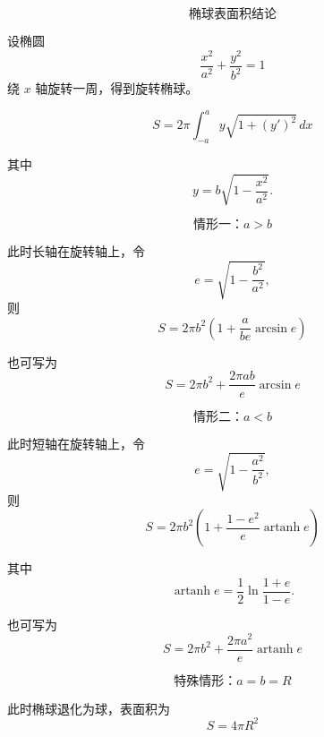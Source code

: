 \[
	\textbf{椭球表面积结论}
\]

设椭圆
\[
	\frac{x^2}{a^2}+\frac{y^2}{b^2}=1
\]
绕 \(x\) 轴旋转一周，得到旋转椭球。

\[
	\boxed{
		S=2\pi\int_{-a}^{a}y\sqrt{1+\left(y'\right)^2}\,dx
	}
\]

其中
\[
	y=b\sqrt{1-\frac{x^2}{a^2}}.
\]

\[
	\textbf{情形一：}a>b
\]

此时长轴在旋转轴上，令
\[
	e=\sqrt{1-\frac{b^2}{a^2}},
\]
则
\[
	\boxed{
		S=2\pi b^2\left(1+\frac{a}{be}\arcsin e\right)
	}
\]

也可写为
\[
	\boxed{
		S=2\pi b^2+\frac{2\pi ab}{e}\arcsin e
	}
\]

\[
	\textbf{情形二：}a<b
\]

此时短轴在旋转轴上，令
\[
	e=\sqrt{1-\frac{a^2}{b^2}},
\]
则
\[
	\boxed{
		S=2\pi b^2\left(1+\frac{1-e^2}{e}\operatorname{artanh}e\right)
	}
\]

其中
\[
	\operatorname{artanh}e
	=
	\frac12\ln\frac{1+e}{1-e}.
\]

也可写为
\[
	\boxed{
		S=2\pi b^2+\frac{2\pi a^2}{e}\operatorname{artanh}e
	}
\]

\[
	\textbf{特殊情形：}a=b=R
\]

此时椭球退化为球，表面积为
\[
	\boxed{
		S=4\pi R^2
	}
\]